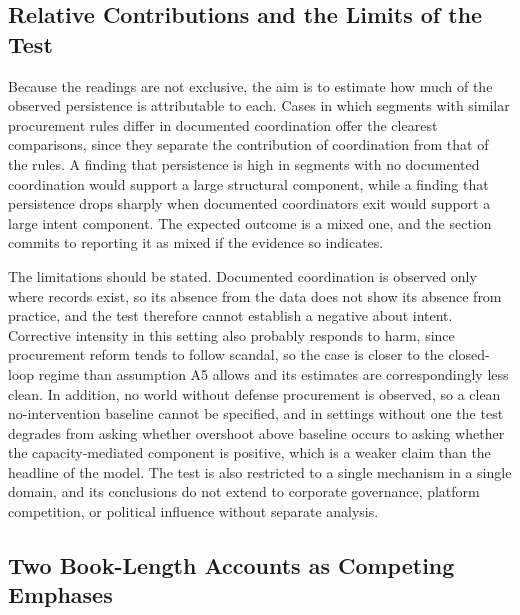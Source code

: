 \documentclass[12pt]{article}
\theoremstyle{remark}
\begin{document}
\subsection{Relative Contributions and the Limits of the Test}

Because the readings are not exclusive, the aim is to estimate how much of the observed persistence is attributable to each. Cases in which segments with similar procurement rules differ in documented coordination offer the clearest comparisons, since they separate the contribution of coordination from that of the rules. A finding that persistence is high in segments with no documented coordination would support a large structural component, while a finding that persistence drops sharply when documented coordinators exit would support a large intent component. The expected outcome is a mixed one, and the section commits to reporting it as mixed if the evidence so indicates.

The limitations should be stated. Documented coordination is observed only where records exist, so its absence from the data does not show its absence from practice, and the test therefore cannot establish a negative about intent. Corrective intensity in this setting also probably responds to harm, since procurement reform tends to follow scandal, so the case is closer to the closed-loop regime than assumption A5 allows and its estimates are correspondingly less clean. In addition, no world without defense procurement is observed, so a clean no-intervention baseline cannot be specified, and in settings without one the test degrades from asking whether overshoot above baseline occurs to asking whether the capacity-mediated component is positive, which is a weaker claim than the headline of the model. The test is also restricted to a single mechanism in a single domain, and its conclusions do not extend to corporate governance, platform competition, or political influence without separate analysis.

\subsection{Two Book-Length Accounts as Competing Emphases}
\end{document}
